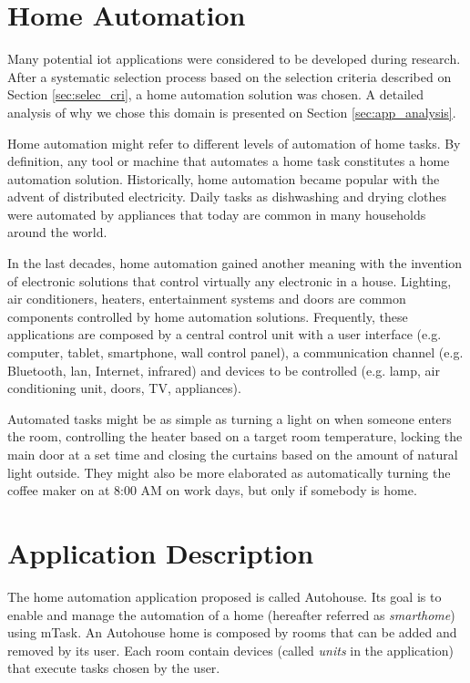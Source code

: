 \section{Home Automation}

Many potential \ac{iot} applications were considered to be developed during research. After a systematic selection process based on the selection criteria described on Section \ref{sec:selec_cri}, a home automation solution was chosen. A detailed analysis of why we chose this domain is presented on Section \ref{sec:app_analysis}.

Home automation might refer to different levels of automation of home tasks. By definition, any tool or machine that automates a home task constitutes a home automation solution. Historically, home automation became popular with the advent of distributed electricity. Daily tasks as dishwashing and drying clothes were automated by appliances that today are common in many households around the world.

In the last decades, home automation gained another meaning with the invention of electronic solutions that control virtually any electronic in a house. Lighting, air conditioners, heaters, entertainment systems and doors are common components controlled by home automation solutions. Frequently, these applications are composed by a central control unit with a user interface (e.g. computer, tablet, smartphone, wall control panel), a communication channel (e.g. Bluetooth, \acs{lan}, Internet, infrared) and devices to be controlled (e.g. lamp, air conditioning unit, doors, TV, appliances).

Automated tasks might be as simple as turning a light on when someone enters the room, controlling the heater based on a target room temperature, locking the main door at a set time and closing the curtains based on the amount of natural light outside. They might also be more elaborated as automatically turning the coffee maker on at 8:00 AM on work days, but only if somebody is home.

\section{Application Description}\label{sec:app_desc}

The home automation application proposed is called Autohouse. Its goal is to enable and manage the automation of a home (hereafter referred as \textit{smarthome}) using mTask. An Autohouse home is composed by rooms that can be added and removed by its user. Each room contain devices (called \textit{units} in the application) that execute tasks chosen by the user. 

